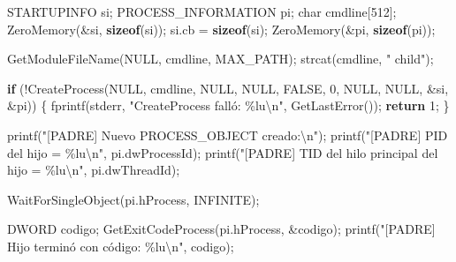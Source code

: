 \documentclass[
  spanish,
]{article}
\newenvironment{Shaded}{}{}
\newcommand{\ControlFlowTok}[1]{\textcolor[rgb]{0.00,0.44,0.13}{\textbf{#1}}}
\newcommand{\DataTypeTok}[1]{\textcolor[rgb]{0.56,0.13,0.00}{#1}}
\newcommand{\DecValTok}[1]{\textcolor[rgb]{0.25,0.63,0.44}{#1}}
\newcommand{\KeywordTok}[1]{\textcolor[rgb]{0.00,0.44,0.13}{\textbf{#1}}}
\newcommand{\NormalTok}[1]{#1}
\newcommand{\OperatorTok}[1]{\textcolor[rgb]{0.40,0.40,0.40}{#1}}
\newcommand{\SpecialCharTok}[1]{\textcolor[rgb]{0.25,0.44,0.63}{#1}}
\newcommand{\StringTok}[1]{\textcolor[rgb]{0.25,0.44,0.63}{#1}}
\begin{document}
\begin{Shaded}
\begin{Highlighting}[]
\NormalTok{    STARTUPINFO si}\OperatorTok{;}
\NormalTok{    PROCESS\_INFORMATION pi}\OperatorTok{;}
    \DataTypeTok{char}\NormalTok{ cmdline}\OperatorTok{[}\DecValTok{512}\OperatorTok{];}
\NormalTok{    ZeroMemory}\OperatorTok{(\&}\NormalTok{si}\OperatorTok{,} \KeywordTok{sizeof}\OperatorTok{(}\NormalTok{si}\OperatorTok{));}
\NormalTok{    si}\OperatorTok{.}\NormalTok{cb }\OperatorTok{=} \KeywordTok{sizeof}\OperatorTok{(}\NormalTok{si}\OperatorTok{);}
\NormalTok{    ZeroMemory}\OperatorTok{(\&}\NormalTok{pi}\OperatorTok{,} \KeywordTok{sizeof}\OperatorTok{(}\NormalTok{pi}\OperatorTok{));}

\NormalTok{    GetModuleFileName}\OperatorTok{(}\NormalTok{NULL}\OperatorTok{,}\NormalTok{ cmdline}\OperatorTok{,}\NormalTok{ MAX\_PATH}\OperatorTok{);}
\NormalTok{    strcat}\OperatorTok{(}\NormalTok{cmdline}\OperatorTok{,} \StringTok{" child"}\OperatorTok{);}

    \ControlFlowTok{if} \OperatorTok{(!}\NormalTok{CreateProcess}\OperatorTok{(}\NormalTok{NULL}\OperatorTok{,}\NormalTok{ cmdline}\OperatorTok{,}\NormalTok{ NULL}\OperatorTok{,}\NormalTok{ NULL}\OperatorTok{,}\NormalTok{ FALSE}\OperatorTok{,} \DecValTok{0}\OperatorTok{,}
\NormalTok{                       NULL}\OperatorTok{,}\NormalTok{ NULL}\OperatorTok{,} \OperatorTok{\&}\NormalTok{si}\OperatorTok{,} \OperatorTok{\&}\NormalTok{pi}\OperatorTok{))}
    \OperatorTok{\{}
\NormalTok{        fprintf}\OperatorTok{(}\NormalTok{stderr}\OperatorTok{,} \StringTok{"CreateProcess falló: }\SpecialCharTok{\%lu\textbackslash{}n}\StringTok{"}\OperatorTok{,}\NormalTok{ GetLastError}\OperatorTok{());}
        \ControlFlowTok{return} \DecValTok{1}\OperatorTok{;}
    \OperatorTok{\}}

\NormalTok{    printf}\OperatorTok{(}\StringTok{"[PADRE] Nuevo PROCESS\_OBJECT creado:}\SpecialCharTok{\textbackslash{}n}\StringTok{"}\OperatorTok{);}
\NormalTok{    printf}\OperatorTok{(}\StringTok{"[PADRE]   PID del hijo = }\SpecialCharTok{\%lu\textbackslash{}n}\StringTok{"}\OperatorTok{,}\NormalTok{ pi}\OperatorTok{.}\NormalTok{dwProcessId}\OperatorTok{);}
\NormalTok{    printf}\OperatorTok{(}\StringTok{"[PADRE]   TID del hilo principal del hijo = }\SpecialCharTok{\%lu\textbackslash{}n}\StringTok{"}\OperatorTok{,}\NormalTok{ pi}\OperatorTok{.}\NormalTok{dwThreadId}\OperatorTok{);}

\NormalTok{    WaitForSingleObject}\OperatorTok{(}\NormalTok{pi}\OperatorTok{.}\NormalTok{hProcess}\OperatorTok{,}\NormalTok{ INFINITE}\OperatorTok{);}

\NormalTok{    DWORD codigo}\OperatorTok{;}
\NormalTok{    GetExitCodeProcess}\OperatorTok{(}\NormalTok{pi}\OperatorTok{.}\NormalTok{hProcess}\OperatorTok{,} \OperatorTok{\&}\NormalTok{codigo}\OperatorTok{);}
\NormalTok{    printf}\OperatorTok{(}\StringTok{"[PADRE] Hijo terminó con código: }\SpecialCharTok{\%lu\textbackslash{}n}\StringTok{"}\OperatorTok{,}\NormalTok{ codigo}\OperatorTok{);}


\end{Highlighting}
\end{Shaded}
\end{document}
